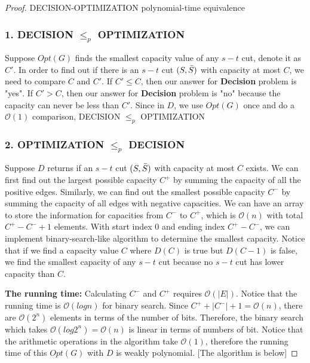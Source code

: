 \documentclass[openany]{article}
\begin{document}
\begin{proof}{}{DECISION-OPTIMIZATION polynomial-time equivalence}
    \subsubsection*{1. DECISION $\leqslant_p$ OPTIMIZATION}

Suppose $Opt(G)$ finds the smallest capacity value of any $s-t$ cut, denote it as $C'$. In order to find out if there is an $s-t$ cut $(S, \Bar{S})$ with capacity at most $C$, we need to compare $C$ and $C'$. If $C' \leqslant C$, then our answer for \textbf{Decision} problem is "yes". If $C' > C$, then our answer for \textbf{Decision} problem is "no" because the capacity can never be less than $C'$. Since in $D$, we use $Opt(G)$ once and do a $\mathcal{O}(1)$ comparison, DECISION $\leqslant_p$ OPTIMIZATION

\subsubsection*{2. OPTIMIZATION $\leqslant_p$ DECISION}

Suppose $D$ returns if an $s-t$ cut $(S,\Bar{S})$ with capacity at most $C$ exists. We can first find out the largest possible capacity $C^+$ by summing the capacity of all the positive edges. Similarly, we can find out the smallest possible capacity $C^-$ by summing the capacity of all edges with negative capacities. We can have an array to store the information for capacities from $C^-$ to $C^+$, which is $\mathcal{O}(n)$ with total $C^+-C^-+1$ elements. With start index $0$ and ending index $C^+-C^-$, we can implement binary-search-like algorithm to determine the smallest capacity. Notice that if we find a capacity value $C$ where $D(C)$ is true but $D(C-1)$ is false, we find the smallest capacity of any $s-t$ cut because no $s-t$ cut has lower capacity than $C$. 

\textbf{The running time:} Calculating $C^-$ and $C^+$ requires $\mathcal{O}(|E|)$. Notice that the running time is $\mathcal{O}(log n)$ for binary search. Since $C^++|C^-|+1 = \mathcal{O}(n)$, there are $\mathcal{O}(2^n)$ elements in terms of the number of bits. Therefore, the binary search which takes $\mathcal{O}(log{2^n}) = \mathcal{O}(n)$ is linear in terms of numbers of bit. Notice that the arithmetic operations in the algorithm take $\mathcal{O}(1)$, therefore the running time of this $Opt(G)$ with $D$ is weakly polynomial. [The algorithm is below]


\end{proof}
\end{document}
